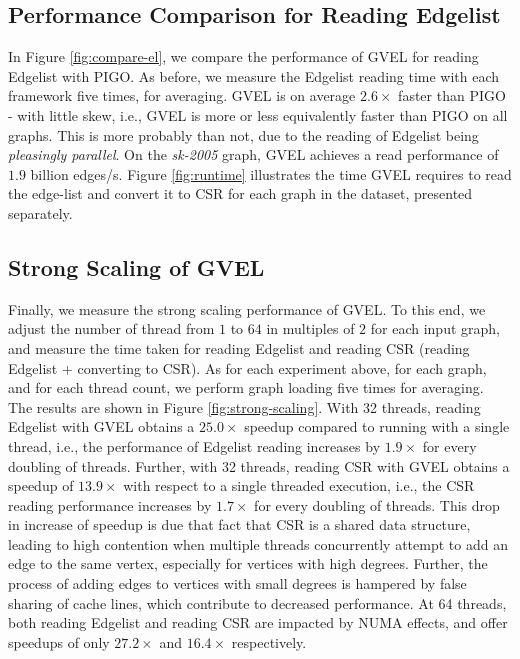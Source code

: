 \subsection{Performance Comparison for Reading Edgelist}

In Figure \ref{fig:compare-el}, we compare the performance of GVEL for reading Edgelist with PIGO. As before, we measure the Edgelist reading time with each framework five times, for averaging. GVEL is on average $2.6\times$ faster than PIGO - with little skew, i.e., GVEL is more or less equivalently faster than PIGO on all graphs. This is more probably than not, due to the reading of Edgelist being \textit{pleasingly parallel}. On the \textit{sk-2005} graph, GVEL achieves a read performance of $1.9$ billion edges/s. Figure \ref{fig:runtime} illustrates the time GVEL requires to read the edge-list and convert it to CSR for each graph in the dataset, presented separately.







\subsection{Strong Scaling of GVEL}

Finally, we measure the strong scaling performance of GVEL. To this end, we adjust the number of thread from $1$ to $64$ in multiples of $2$ for each input graph, and measure the time taken for reading Edgelist and reading CSR (reading Edgelist + converting to CSR). As for each experiment above, for each graph, and for each thread count, we perform graph loading five times for averaging. The results are shown in Figure \ref{fig:strong-scaling}. With 32 threads, reading Edgelist with GVEL obtains a $25.0\times$ speedup compared to running with a single thread, i.e., the performance of Edgelist reading increases by $1.9\times$ for every doubling of threads. Further, with 32 threads, reading CSR with GVEL obtains a speedup of $13.9\times$ with respect to a single threaded execution, i.e., the CSR reading performance increases by $1.7\times$ for every doubling of threads. This drop in increase of speedup is due that fact that CSR is a shared data structure, leading to high contention when multiple threads concurrently attempt to add an edge to the same vertex, especially for vertices with high degrees. Further, the process of adding edges to vertices with small degrees is hampered by false sharing of cache lines, which contribute to decreased performance. At 64 threads, both reading Edgelist and reading CSR are impacted by NUMA effects, and offer speedups of only $27.2\times$ and $16.4\times$ respectively.

